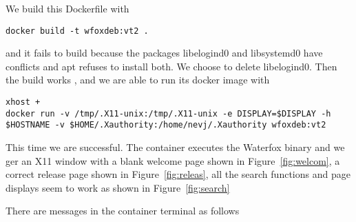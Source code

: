 \documentclass{article}  %
\begin{document}
We build this Dockerfile with
\begin{verbatim}
docker build -t wfoxdeb:vt2 .
\end{verbatim}
and it fails to build because the packages libelogind0 and libsystemd0 have conflicts and apt refuses to install both. We choose to delete libelogind0. 
Then the build works , and we are able to run its docker image with
\begin{verbatim}
xhost +
docker run -v /tmp/.X11-unix:/tmp/.X11-unix -e DISPLAY=$DISPLAY -h $HOSTNAME -v $HOME/.Xauthority:/home/nevj/.Xauthority wfoxdeb:vt2
\end{verbatim}
This time we are successful. The container executes the Waterfox binary and we ger an X11 window with a blank welcome page shown in Figure~\ref{fig:welcom}, a correct release page shown in Figure~\ref{fig:releas}, all the search functions and page displays seem to work as shown in Figure~\ref{fig:search}



There are messages in the container terminal as follows
\end{document}
